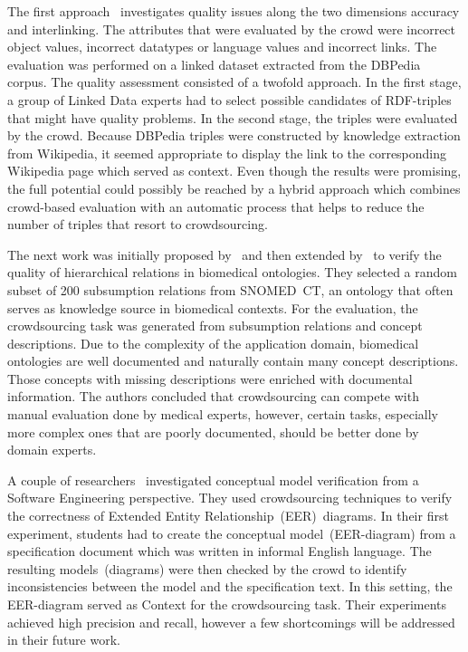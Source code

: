 The first approach~\cite{acosta2018} investigates quality issues along the two dimensions accuracy and interlinking. The attributes that were evaluated by the crowd were incorrect object values, incorrect datatypes or language values and incorrect links. The evaluation was performed on a linked dataset extracted from the DBPedia corpus. The quality assessment consisted of a twofold approach. In the first stage, a group of Linked Data experts had to select possible candidates of RDF-triples that might have quality problems. In the second stage, the triples were evaluated by the crowd. Because DBPedia triples were constructed by knowledge extraction from Wikipedia, it seemed appropriate to display the link to the corresponding Wikipedia page which served as context. Even though the results were promising, the full potential could possibly be reached by a hybrid approach which combines crowd-based evaluation with an automatic process that helps to reduce the number of triples that resort to crowdsourcing. 

The next work was initially proposed by~\cite{mortensen2015} and then extended by~\cite{mortensen2016} to verify the quality of hierarchical relations in biomedical ontologies. They selected a random subset of 200 subsumption relations from SNOMED~CT, an ontology that often serves as knowledge source in biomedical contexts. For the evaluation, the crowdsourcing task was generated from subsumption relations and concept descriptions. Due to the complexity of the application domain, biomedical ontologies are well documented and naturally contain many concept descriptions. Those concepts with missing descriptions were enriched with documental information. The authors concluded that crowdsourcing can compete with manual evaluation done by medical experts, however, certain tasks, especially more complex ones that are poorly documented, should be better done by domain experts. 

A couple of researchers~\cite{sabou2018, winkler2017, winkler2017_2} investigated conceptual model verification from a Software Engineering perspective. They used crowdsourcing techniques to verify the correctness of Extended Entity Relationship~(EER)~diagrams. In their first experiment, students had to create the conceptual model~(EER-diagram) from a specification document which was written in informal English language. The resulting models~(diagrams) were then checked by the crowd to identify inconsistencies between the model and the specification text. In this setting, the EER-diagram served as Context for the crowdsourcing task. Their experiments achieved high precision and recall, however a few shortcomings will be addressed in their future work. 

